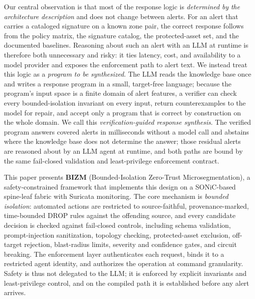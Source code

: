 \documentclass[final,5p]{elsarticle}
\begin{document}
Our central observation is that most of the response logic is \emph{determined by the architecture description} and does not change between alerts. For an alert that carries a cataloged signature on a known zone pair, the correct response follows from the policy matrix, the signature catalog, the protected-asset set, and the documented baselines. Reasoning about such an alert with an LLM at runtime is therefore both unnecessary and risky: it ties latency, cost, and availability to a model provider and exposes the enforcement path to alert text. We instead treat this logic as a \emph{program to be synthesized}. The LLM reads the knowledge base once and writes a response program in a small, target-free language; because the program's input space is a finite domain of alert features, a verifier can check every bounded-isolation invariant on every input, return counterexamples to the model for repair, and accept only a program that is correct by construction on the whole domain. We call this \emph{verification-guided response synthesis}. The verified program answers covered alerts in milliseconds without a model call and abstains where the knowledge base does not determine the answer; those residual alerts are reasoned about by an LLM agent at runtime, and both paths are bound by the same fail-closed validation and least-privilege enforcement contract.

This paper presents \textbf{BIZM} (Bounded-Isolation Zero-Trust Microsegmentation), a safety-constrained framework that implements this design on a SONiC-based spine-leaf fabric with Suricata monitoring. The core mechanism is \emph{bounded isolation}: automated actions are restricted to source-faithful, provenance-marked, time-bounded DROP rules against the offending source, and every candidate decision is checked against fail-closed controls, including schema validation, prompt-injection sanitization, topology checking, protected-asset exclusion, off-target rejection, blast-radius limits, severity and confidence gates, and circuit breaking. The enforcement layer authenticates each request, binds it to a restricted agent identity, and authorizes the operation at command granularity. Safety is thus not delegated to the LLM; it is enforced by explicit invariants and least-privilege control, and on the compiled path it is established before any alert arrives.
\end{document}
